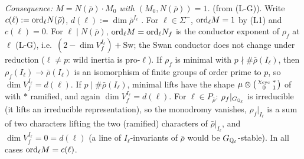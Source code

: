 \noindent\emph{Consequence: $M=N(\bar\rho)\cdot M_0$ with $(M_0,N(\bar\rho))=1$.} \stpmc{} (from (L-G)). Write $c(\ell):=\mathrm{ord}_\ell N(\bar\rho)$,
$d(\ell):=\dim\bar\rho^{I_\ell}$ \cite[\S2.1.2, p.~3]{KO}. For $\ell\in\Sigma^-$, $\mathrm{ord}_\ell M=1$ by (L1) and $c(\ell)=0$. For $\ell\mid N(\bar\rho)$,
$\mathrm{ord}_\ell M=\mathrm{ord}_\ell N_f$ is the conductor exponent of $\rho_f$ at $\ell$ (L-G), i.e.\ $(2-\dim V_f^{I_\ell})+\mathrm{Sw}$; the Swan conductor
does not change under reduction ($\ell\ne p$: wild inertia is pro-$\ell$). If $\rho_f$ is minimal with $p\nmid\#\bar\rho(I_\ell)$, then
$\rho_f(I_\ell)\to\bar\rho(I_\ell)$ is an isomorphism of finite groups of order prime to $p$, so $\dim V_f^{I_\ell}=d(\ell)$. If $p\mid\#\bar\rho(I_\ell)$,
minimal lifts have the shape $\mu\otimes\left(\begin{smallmatrix}\chi_{\rm cyc}&*\\0&1\end{smallmatrix}\right)$ of \cite[p.~11]{KO} with $*$ ramified,
and again $\dim V_f^{I_\ell}=d(\ell)$. For $\ell\in P_{\bar\rho}$: $\rho_f|_{G_{\mathbb{Q}_\ell}}$ is irreducible (it lifts an irreducible
representation), so the monodromy vanishes, $\rho_f|_{I_\ell}$ is a sum of two characters lifting the two (ramified) characters of
$\bar\rho|_{I_\ell}$, and $\dim V_f^{I_\ell}=0=d(\ell)$ (a line of $I_\ell$-invariants of $\bar\rho$ would be $G_{\mathbb{Q}_\ell}$-stable). In all cases
$\mathrm{ord}_\ell M=c(\ell)$.

